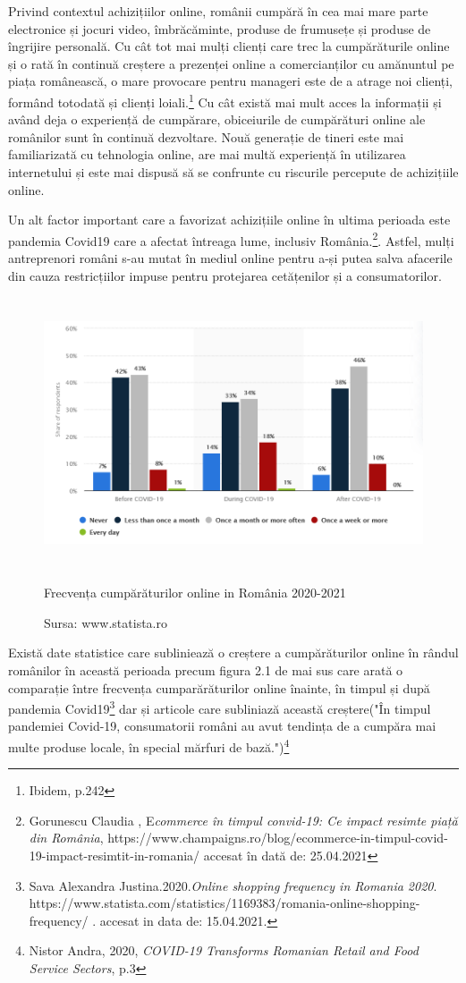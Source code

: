 \documentclass[a4paper, 12pt]{article}
\begin{document}
	\quad Privind contextul achizițiilor online, românii cumpără în cea mai mare parte electronice și jocuri video, îmbrăcăminte, produse de frumusețe și produse de îngrijire personală. Cu cât tot mai mulți clienți care trec la cumpărăturile online și o rată în continuă creștere a prezenței online a comercianților cu amănuntul pe piața românească, o mare provocare pentru manageri este de a atrage noi clienți, formând  totodată și clienți loiali.\footnote{Ibidem, p.242} Cu cât există mai mult acces la informații și având deja o experiență de cumpărare, obiceiurile de cumpărături online ale românilor sunt în continuă dezvoltare. Nouă generație de tineri este mai familiarizată cu tehnologia online, are mai multă experiență în utilizarea internetului și este mai dispusă să se confrunte cu riscurile percepute de achizițiile online.
	
	\quad Un alt factor important care a favorizat achizițiile online în ultima perioada este pandemia Covid19 care a afectat întreaga lume, inclusiv România.\footnote{Gorunescu Claudia , E\textit{commerce în timpul convid-19: Ce impact resimte piață din România},
		https://www.champaigns.ro/blog/ecommerce-in-timpul-covid-19-impact-resimtit-in-romania/ accesat în dată de: 25.04.2021}. Astfel, mulți antreprenori români s-au mutat în mediul online pentru a-și putea salva afacerile din cauza restricțiilor impuse pentru protejarea cetățenilor și a consumatorilor.
	\begin{figure}[!htb]
		\centering
		\includegraphics[width=12cm, height=8cm]{"figures/fourth.png"}
		\caption{ Frecvența cumpărăturilor online in România 2020-2021}\label{fig:fourth}
		\caption*{Sursa: www.statista.ro}
	\end{figure}

	\quad Există date statistice care subliniează o creștere a cumpărăturilor online în rândul românilor în această perioada precum figura 2.1 de mai sus care arată o comparație între frecvența cumparărăturilor online înainte, în timpul și după pandemia Covid19\footnote{Sava Alexandra Justina.2020.\textit{Online shopping frequency in Romania 2020}. https://www.statista.com/statistics/1169383/romania-online-shopping-frequency/ . accesat in data de: 15.04.2021.} dar și articole care subliniază această creștere("În timpul pandemiei Covid-19, consumatorii români au avut tendința de a cumpăra mai multe produse locale, în special mărfuri de bază.")\footnote{Nistor Andra, 2020, \textit{COVID-19 Transforms Romanian Retail and Food Service Sectors}, p.3}
	  
\end{document}
